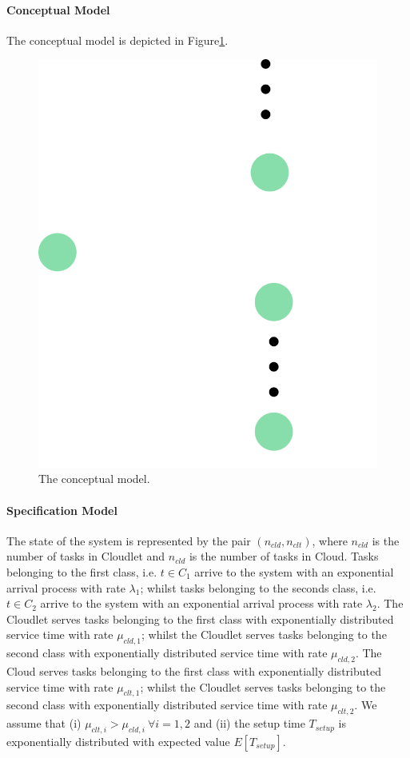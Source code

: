 \paragraph{Conceptual Model}
The conceptual model is depicted in Figure\ref{fig:modeling-conceptual-model}.
\begin{figure}
	\label{fig:modeling-conceptual-model}
	\includegraphics[width=\columnwidth]{fig/modeling-conceptual-model}
	\caption{The conceptual model.}
\end{figure}

\paragraph{Specification Model}
The state of the system is represented by the pair $(n_{cld},n_{clt})$, where $n_{cld}$ is the number of tasks in Cloudlet and $n_{cld}$ is the number of tasks in Cloud.
Tasks belonging to the first class, i.e. $t\in C_{1}$ arrive to the system with an exponential arrival process with rate $ \lambda_{1}$; whilst tasks belonging to the seconds class, i.e. $t\in C_{2}$ arrive to the system with an exponential arrival process with rate $ \lambda_{2}$.
The Cloudlet serves tasks belonging to the first class with exponentially distributed service time with rate $\mu_{cld,1}$; whilst the Cloudlet serves tasks belonging to the second class with exponentially distributed service time with rate $\mu_{cld,2}$.
The Cloud serves tasks belonging to the first class with exponentially distributed service time with rate $\mu_{clt,1}$; whilst the Cloudlet serves tasks belonging to the second class with exponentially distributed service time with rate $\mu_{clt,2}$.
We assume that 
(i) $\mu_{clt,i}>\mu_{cld,i}\ \forall i=1,2$ and
(ii) the setup time $T_{setup}$ is exponentially distributed with expected value $E[T_{setup}]$.

